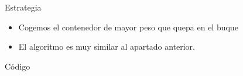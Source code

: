 \begin{frame}{Estrategia}
\begin{itemize}
  \item Cogemos el contenedor de mayor peso que quepa en el buque
  \item El algoritmo es muy similar al apartado anterior.
\end{itemize}
\end{frame}

\begin{frame}[fragile]{Código}

\end{frame}


